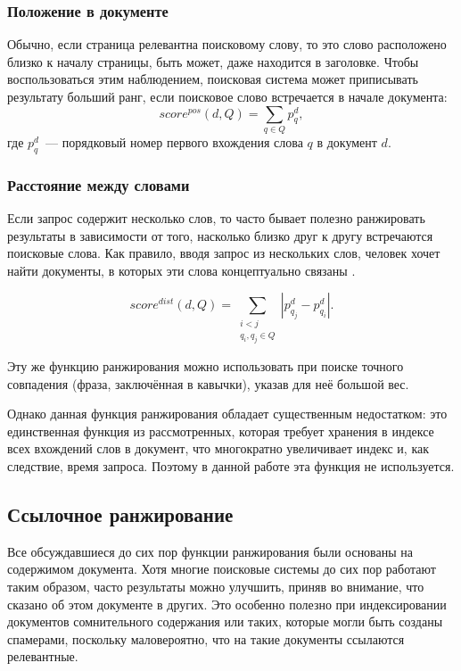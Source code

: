\subsubsection{Положение в документе} \label{sssec:position}
Обычно, если страница релевантна поисковому слову, то это слово расположено близко к началу страницы, быть может, даже находится в заголовке. Чтобы воспользоваться этим наблюдением, поисковая система может приписывать результату больший ранг, если поисковое слово встречается в начале документа:
\begin{equation}
  score^{pos}(d, Q)=\sum_{q\in Q}p_q^d,
\end{equation}
где $p_q^d$~--- порядковый номер первого вхождения слова $q$ в документ $d$.


\subsubsection{Расстояние между словами}
Если запрос содержит несколько слов, то часто бывает полезно ранжировать результаты в зависимости от того, насколько близко друг к другу встречаются поисковые слова. Как правило, вводя запрос из нескольких слов, человек хочет найти документы, в которых эти слова концептуально связаны \cite{segaran07}.

\begin{equation}
  score^{dist}(d, Q)=\sum_{\substack{i<j \\ q_i, q_j\in Q}} |p_{q_j}^d - p_{q_i}^d|.
\end{equation}

Эту же функцию ранжирования можно использовать при поиске точного совпадения (фраза, заключённая в кавычки), указав для неё большой вес.

Однако данная функция ранжирования обладает существенным недостатком: это единственная функция из рассмотренных, которая требует хранения в индексе всех вхождений слов в документ, что многократно увеличивает индекс и, как следствие, время запроса. Поэтому в данной работе эта функция не используется.


\subsection{Ссылочное ранжирование}
Все обсуждавшиеся до сих пор функции ранжирования были основаны на содержимом документа. Хотя многие поисковые системы до сих пор работают таким образом, часто результаты можно улучшить, приняв во внимание, что сказано об этом документе в других. Это особенно полезно при индексировании документов сомнительного содержания или таких, которые могли быть созданы спамерами, поскольку маловероятно, что на такие документы ссылаются релевантные.


